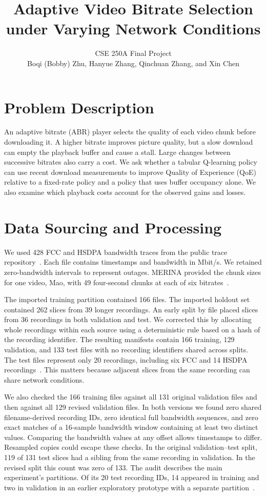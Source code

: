 \documentclass[10pt,letterpaper]{article}
\title{\vspace{-1.2em}Adaptive Video Bitrate Selection\\under Varying Network Conditions}
\author{CSE 250A Final Project\\Boqi (Bobby) Zhu, Hanyue Zhang, Qinchuan Zhang, and Xin Chen}
\date{}
\newif\ifreview
\newcommand{\reviewcolor}{\ifreview\color{reviewred}\fi}
\newenvironment{reviewedit}{\reviewcolor}{}
\begin{document}
\maketitle
\vspace{-1.5em}

\section{Problem Description}

An adaptive bitrate (ABR) player selects the quality of each video chunk before
downloading it. A higher bitrate improves picture quality, but a slow download
can empty the playback buffer and cause a stall. Large changes between
successive bitrates also carry a cost. We ask whether a tabular Q-learning
policy can use recent download measurements to improve Quality of Experience
(QoE) relative to a fixed-rate policy and a policy that uses buffer occupancy
alone. We also examine which playback costs account for the observed gains
and losses.

\section{Data Sourcing and Processing}

We used 428 FCC and HSDPA bandwidth traces from the public trace
repository~\cite{traces}. Each file contains timestamps and bandwidth in Mbit/s.
We retained zero-bandwidth intervals to represent outages. MERINA provided the
chunk sizes for one video, Mao, with 49 four-second chunks at each of six
bitrates~\cite{merina}.

The imported training partition contained 166 files. The imported holdout set
contained 262 slices from 39 longer recordings. An early split by file placed
slices from 36 recordings in both validation and test. We corrected this by
allocating whole recordings within each source using a deterministic rule
based on a hash of the recording identifier. The resulting manifests contain
166 training, 129 validation, and 133 test files with no recording identifiers
shared across splits. The test files represent only 20 recordings, including
six FCC and 14 HSDPA recordings~\cite{splits}. This matters because adjacent
slices from the same recording can share network conditions.

\begin{reviewedit}
We also checked the 166 training files against all 131 original validation
files and then against all 129 revised validation files. In both versions
we found zero shared filename-derived recording IDs, zero identical full
bandwidth sequences, and zero exact matches of a 16-sample bandwidth window
containing at least two distinct values. Comparing the bandwidth values at
any offset allows timestamps to differ. Resampled copies could escape these
checks. In the original validation--test split, 119 of 131 test slices had
a sibling from the same recording in validation. In the revised split this
count was zero of 133. The audit describes the main experiment's partitions.
Of its 20 test recording IDs, 14 appeared in training and two in validation
in an earlier exploratory prototype with a separate partition~\cite{prototype}.
\end{reviewedit}
\end{document}
